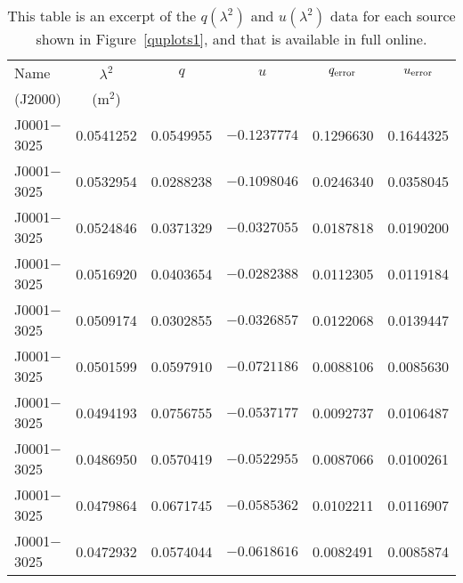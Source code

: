 \documentclass{mnras}
\begin{document}
\begin{table*}
	\centering
	\caption{This table is an excerpt of the $q(\lambda^2)$ and $u(\lambda^2)$ data for each source shown in Figure~\ref{quplots1}, and that is available in full online.}
	\label{exdata}
	\begin{tabular}{lccccc} 
		\hline
		Name & $\lambda^2$ & $q$ & $u$ & $q_{\rm error}$ & $u_{\rm error}$ \\
		(J2000) & (m$^2$) &   &  &  &  \\
		\hline
J0001$-$3025  &   0.0541252  &   0.0549955  &   $-0.1237774$  &   0.1296630  &   0.1644325 \\
J0001$-$3025  &   0.0532954  &   0.0288238  &   $-0.1098046$  &   0.0246340  &   0.0358045 \\
J0001$-$3025  &   0.0524846  &   0.0371329  &   $-0.0327055$  &   0.0187818  &   0.0190200 \\
J0001$-$3025  &   0.0516920  &   0.0403654  &   $-0.0282388$  &   0.0112305  &  0.0119184 \\
J0001$-$3025  &   0.0509174  &   0.0302855  &   $-0.0326857$  &   0.0122068  &   0.0139447 \\
J0001$-$3025  &   0.0501599  &   0.0597910  &   $-0.0721186$  &   0.0088106  &   0.0085630 \\
J0001$-$3025  &   0.0494193  &   0.0756755  &   $-0.0537177$  &   0.0092737  &   0.0106487 \\
J0001$-$3025  &   0.0486950  &   0.0570419  &   $-0.0522955$  &   0.0087066  &   0.0100261 \\
J0001$-$3025  &   0.0479864  &   0.0671745  &   $-0.0585362$  &   0.0102211  &   0.0116907 \\
J0001$-$3025  &   0.0472932  &   0.0574044  &   $-0.0618616$  &   0.0082491  &   0.0085874 \\

\end{tabular}
\end{table*}
\end{document}
